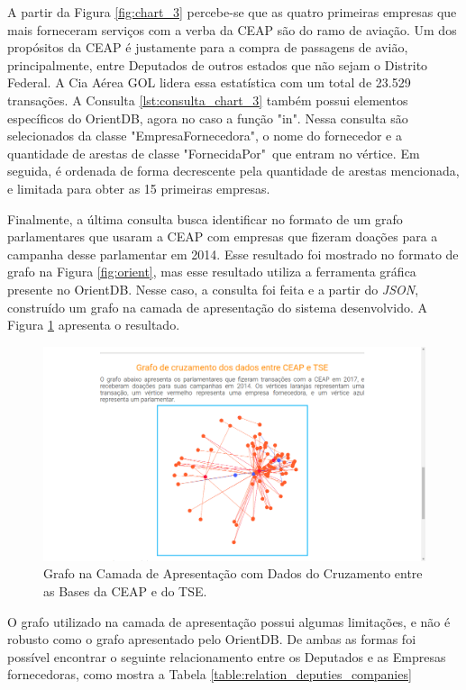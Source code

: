 \documentclass[12pt]{article}
\begin{document}
A partir da Figura \ref{fig:chart_3} percebe-se que as quatro primeiras empresas que mais forneceram serviços com a verba da CEAP são do ramo de aviação. Um dos propósitos da CEAP é justamente para a compra de passagens de avião, principalmente, entre Deputados de outros estados que não sejam o Distrito Federal. A Cia Aérea GOL lidera essa estatística com um total de 23.529 transações. A Consulta \ref{lst:consulta_chart_3} também possui elementos específicos do OrientDB, agora no caso a função "in". Nessa consulta são selecionados da classe "EmpresaFornecedora", o nome do fornecedor e a quantidade de arestas de classe "FornecidaPor"\ que entram no vértice. Em seguida, é ordenada de forma decrescente pela quantidade de arestas mencionada, e limitada para obter as 15 primeiras empresas.

Finalmente, a última consulta busca identificar no formato de um grafo parlamentares que usaram a CEAP com empresas que fizeram doações para a campanha desse parlamentar em 2014. Esse resultado foi mostrado no formato de grafo na Figura \ref{fig:orient}, mas esse resultado utiliza a ferramenta gráfica presente no OrientDB. Nesse caso, a consulta foi feita e a partir do \textit{JSON}, construído um grafo na camada de apresentação do sistema desenvolvido. A Figura \ref{fig:sigma} apresenta o resultado.

\begin{figure}[ht]
\centering
\includegraphics[width=.7\textwidth]{sigma.png}
\caption{Grafo na Camada de Apresentação com Dados do Cruzamento entre as Bases da CEAP e do TSE.}
\label{fig:sigma}
\end{figure}

O grafo utilizado na camada de apresentação possui algumas limitações, e não é robusto como o grafo apresentado pelo OrientDB. De ambas as formas foi possível encontrar o seguinte relacionamento entre os Deputados e as Empresas fornecedoras, como mostra a Tabela \ref{table:relation_deputies_companies}
\end{document}
